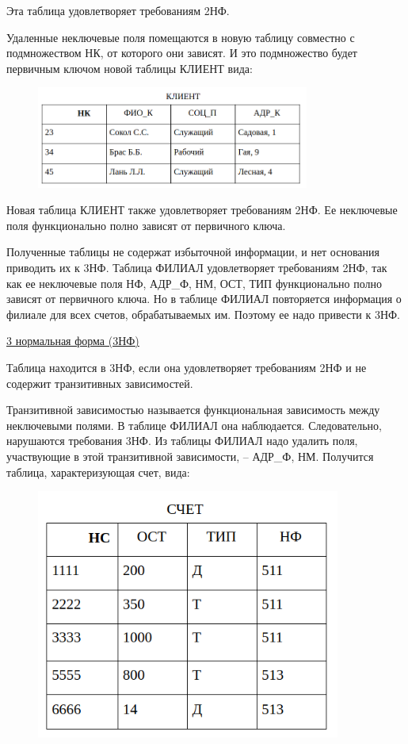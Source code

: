 \begin{enumerate}
    Эта таблица удовлетворяет требованиям 2НФ.

    Удаленные неключевые поля помещаются в новую таблицу совместно с подмножеством НК, от которого они зависят.
    И это подмножество будет первичным ключом новой таблицы КЛИЕНТ вида:

    \begin{figure}[H]
        \centering
        \includegraphics[width=0.8\textwidth]{assets/security/pic21.png}
        \label{fig:mesh23}
    \end{figure}

    Новая таблица КЛИЕНТ также удовлетворяет требованиям 2НФ. Ее неключевые поля функционально полно зависят
    от первичного ключа.

    Полученные таблицы не содержат избыточной информации, и нет основания приводить их к 3НФ. Таблица ФИЛИАЛ
    удовлетворяет требованиям 2НФ, так как ее неключевые поля НФ, АДР\_Ф, НМ, ОСТ, ТИП функционально полно
    зависят от первичного ключа. Но в таблице ФИЛИАЛ повторяется информация о филиале для всех счетов,
    обрабатываемых им. Поэтому ее надо привести к 3НФ.

    \underline{3 нормальная форма (3НФ)}

    Таблица находится в 3НФ, если она удовлетворяет требованиям 2НФ и не содержит транзитивных зависимостей.

    Транзитивной зависимостью называется функциональная зависимость между неключевыми полями. В таблице ФИЛИАЛ
    она наблюдается. Следовательно, нарушаются требования 3НФ. Из таблицы ФИЛИАЛ надо удалить поля, участвующие
    в этой транзитивной зависимости, – АДР\_Ф, НМ. Получится таблица, характеризующая счет, вида:

    \begin{figure}[H]
        \centering
        \includegraphics[width=100mm]{assets/security/pic22.png}
        \label{fig:mesh24}
    \end{figure}


\end{enumerate}
